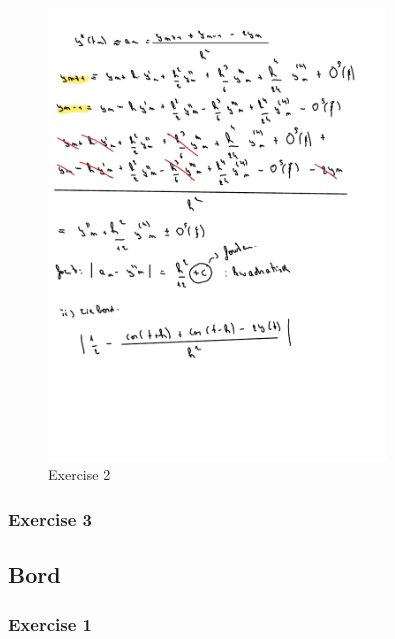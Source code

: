 \documentclass[a4paper]{report}
\begin{document}
\begin{figure}[H]
	\centering
	\includegraphics[width=0.8\textwidth]{./assets/wc_1_ex_2.pdf}
	\caption{Exercise 2}
\end{figure}

\subsubsection{Exercise 3}




\subsection{Bord}

\subsubsection{Exercise 1}
\end{document}

